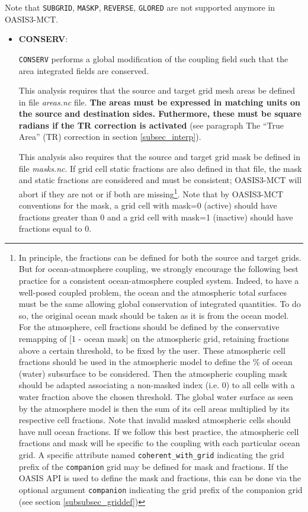 Note that {\tt SUBGRID}, {\tt MASKP}, {\tt REVERSE}, {\tt GLORED} are not supported anymore in OASIS3-MCT.

\begin{itemize}

\item {\bf CONSERV}:

  {\tt CONSERV} performs a global modification of the coupling field such
  that the area integrated fields are conserved.
 
  This analysis requires that the source and target grid mesh areas be
  defined in file {\it areas.nc} file.
{\bf The areas must be expressed in matching units
  on the source and destination sides. Futhermore, these must be square radians if the TR correction is activated} (see paragraph The ``True Area'' (TR) correction in section \ref{subsec_interp}). 

 This analysis also requires that the source and target grid
  mask be defined in file {\it masks.nc}.
  If grid cell static fractions are also defined in that file, the mask
  and static fractions are considered and must be consistent; OASIS3-MCT will abort if
  they are not or if both are missing\footnote{
 In principle, the fractions can be defined for both the source and target grids. But for ocean-atmosphere coupling, we strongly encourage the following best practice for a consistent ocean-atmosphere coupled system. Indeed, to have a well-posed coupled problem, the ocean and the atmospheric total surfaces must be the same allowing global conservation of integrated quantities. To do so, the original ocean mask should be taken as it is from the ocean model. For the atmosphere, cell fractions should be defined by the conservative remapping of [1 - ocean mask] on the atmospheric grid, retaining fractions above a certain threshold, to be fixed by the user. These atmospheric cell fractions should be used in the atmospheric model to define the \% of ocean (water) subsurface to be considered. Then the atmospheric coupling mask should be adapted associating a non-masked index (i.e. 0) to all cells with a water fraction above the chosen threshold. The global water surface as seen by the atmosphere model is then the sum of its cell areas multiplied by its respective cell fractions. Note that invalid masked atmospheric cells should have null ocean fractions. If we follow this best practice, the atmospheric cell fractions and mask will be specific to the coupling with each particular ocean grid. A specific attribute named {\tt coherent\_with\_grid} indicating the grid prefix of the {\tt companion} grid may be defined for mask and fractions. If the OASIS API is used to define the mask and fractions, this can be done via the optional argument {\tt companion} indicating the grid prefix of the companion grid (see section \ref{subsubsec_griddef})}.  Note that by OASIS3-MCT conventions for the mask, a grid cell with mask=0 (active) should have fractions greater than 0 and a grid cell with mask=1 (inactive)
  should have fractions equal to 0. 


\end{itemize}
